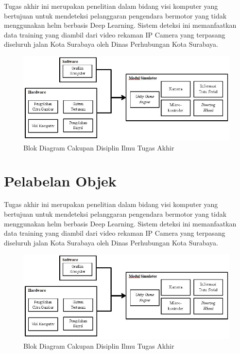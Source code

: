 	\par Tugas akhir ini merupakan penelitian dalam bidang visi komputer yang bertujuan untuk mendeteksi pelanggaran pengendara bermotor yang tidak menggunakan helm berbasis Deep Learning. Sistem deteksi ini memanfaatkan data training yang diambil dari video rekaman IP Camera yang terpasang diseluruh jalan Kota Surabaya oleh Dinas Perhubungan Kota Surabaya.
\begin{figure}[H]
	\captionsetup{justification=centering}
	\includegraphics[scale=0.55]{img/cakupanTA.JPG}
	\caption{Blok Diagram Cakupan Disiplin Ilmu Tugas Akhir}
	\label{fig: 3_1}
\end{figure}
\vspace{1ex}

\section{Pelabelan Objek}
\vspace{1ex}

	\par Tugas akhir ini merupakan penelitian dalam bidang visi komputer yang bertujuan untuk mendeteksi pelanggaran pengendara bermotor yang tidak menggunakan helm berbasis Deep Learning. Sistem deteksi ini memanfaatkan data training yang diambil dari video rekaman IP Camera yang terpasang diseluruh jalan Kota Surabaya oleh Dinas Perhubungan Kota Surabaya.
\begin{figure}[H]
	\captionsetup{justification=centering}
	\includegraphics[scale=0.55]{img/cakupanTA.JPG}
	\caption{Blok Diagram Cakupan Disiplin Ilmu Tugas Akhir}
	\label{fig: 3_1}
\end{figure}
\vspace{1ex}
    
